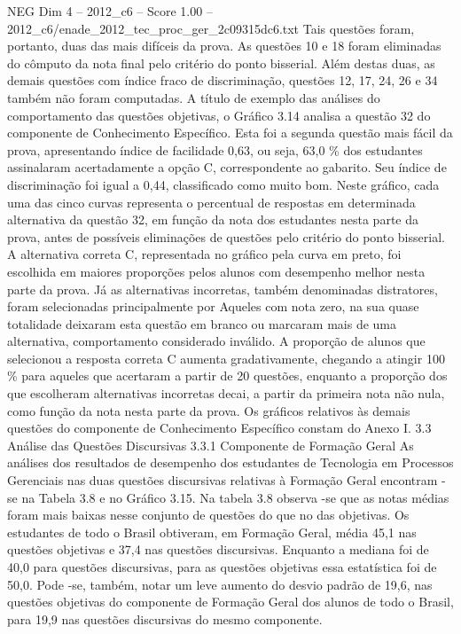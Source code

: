 \begin{textsample}{NEG Dim 4 – 2012\_c6 – Score 1.00 – 2012\_c6/enade\_2012\_tec\_proc\_ger\_2c09315dc6.txt}
Tais questões foram, portanto, duas das mais difíceis da prova.
As questões 10 e 18 foram eliminadas do cômputo da nota final pelo critério do ponto bisserial.
Além destas duas, as demais questões com índice fraco de discriminação, questões 12, 17, 24, 26 e 34 também não foram computadas.
A título de exemplo das análises do comportamento das questões objetivas, o Gráfico 3.14 analisa a questão 32 do componente de Conhecimento Específico.
Esta foi a segunda questão mais fácil da prova, apresentando índice de facilidade 0,63, ou seja, 63,0 \% dos estudantes assinalaram acertadamente a opção C, correspondente ao gabarito.
Seu índice de discriminação foi igual a 0,44, classificado como muito bom.
Neste gráfico, cada uma das cinco curvas representa o percentual de respostas em determinada alternativa da questão 32, em função da nota dos estudantes nesta parte da prova, antes de possíveis eliminações de questões pelo critério do ponto bisserial.
A alternativa correta C, representada no gráfico pela curva em preto, foi escolhida em maiores proporções pelos alunos com desempenho melhor nesta parte da prova.
Já as alternativas incorretas, também denominadas distratores, foram selecionadas principalmente por Aqueles com nota zero, na sua quase totalidade deixaram esta questão em branco ou marcaram mais de uma alternativa, comportamento considerado inválido.
A proporção de alunos que selecionou a resposta correta C aumenta gradativamente, chegando a atingir 100 \% para aqueles que acertaram a partir de 20 questões, enquanto a proporção dos que escolheram alternativas incorretas decai, a partir da primeira nota não nula, como função da nota nesta parte da prova.
Os gráficos relativos às demais questões do componente de Conhecimento Específico constam do Anexo I. 3.3 Análise das Questões Discursivas 3.3.1 Componente de Formação Geral As análises dos resultados de desempenho dos estudantes de Tecnologia em Processos Gerenciais nas duas questões discursivas relativas à Formação Geral encontram -se na Tabela 3.8 e no Gráfico 3.15.
Na tabela 3.8 observa -se que as notas médias foram mais baixas nesse conjunto de questões do que no das objetivas.
Os estudantes de todo o Brasil obtiveram, em Formação Geral, média 45,1 nas questões objetivas e 37,4 nas questões discursivas.
Enquanto a mediana foi de 40,0 para questões discursivas, para as questões objetivas essa estatística foi de 50,0.
Pode -se, também, notar um leve aumento do desvio padrão de 19,6, nas questões objetivas do componente de Formação Geral dos alunos de todo o Brasil, para 19,9 nas questões discursivas do mesmo componente.

\end{textsample}
